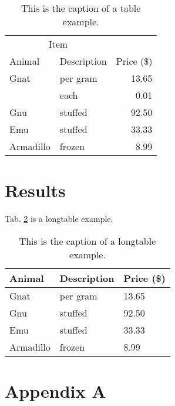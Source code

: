 \documentclass[11pt]{article} %
\begin{document}
\begin{table}[H]
\centering
\caption{This is the caption of a table example.}
\label{tab:table}
\begin{tabular}{llr}
\toprule
\multicolumn{2}{c}{Item}\\
\cmidrule(r){1-2}
Animal & Description & Price (\$)\\
\midrule
Gnat & per gram & 13.65\\
& each & 0.01\\
Gnu & stuffed & 92.50\\
Emu & stuffed & 33.33\\
Armadillo & frozen & 8.99\\
\bottomrule
\end{tabular}
\end{table}

\section{Results}

Tab. \ref{tab:longtable_default} is a longtable example.

\begin{longtable}{lll}
\caption{This is the caption of a longtable example.}\label{tab:longtable_default}\\
\toprule
Animal & Description & Price (\$)\\
\midrule
Gnat & per gram & 13.65\\
Gnu & stuffed & 92.50\\
Emu & stuffed & 33.33\\
Armadillo & frozen & 8.99\\
\bottomrule
\end{longtable}



\section*{Appendix A}
\renewcommand\thefigure{A\arabic{figure}}
\renewcommand{\thetable}{A\arabic{table}}
\setcounter{figure}{0}
\setcounter{table}{0}
\end{document}
